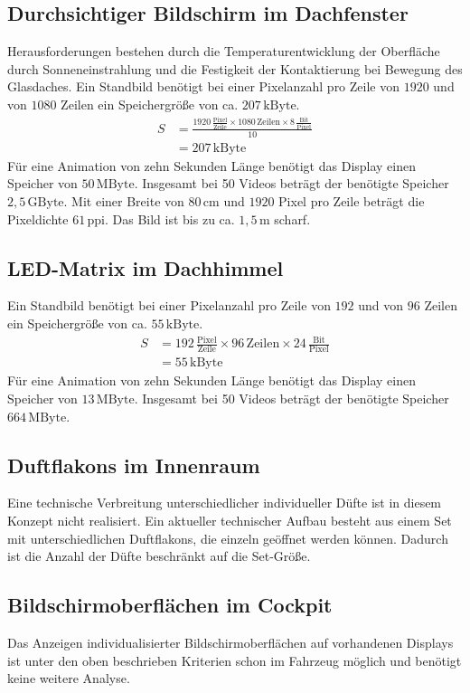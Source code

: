 \subsection{Durchsichtiger Bildschirm im Dachfenster} 
Herausforderungen bestehen durch die Temperaturentwicklung der Oberfläche durch Sonneneinstrahlung und die Festigkeit der Kontaktierung bei Bewegung des Glasdaches. 
Ein Standbild benötigt bei einer Pixelanzahl pro Zeile von $ 1920 $ und von $ 1080 $ Zeilen ein Speichergröße von ca. $ 207\,\mathrm{kByte}$. 
\begin{align}
	S &= \frac{1920\,\frac{\mathrm{Pixel}}{\mathrm{Zeile}}\times 1080\,\mathrm{Zeilen} \times 8\,\frac{\mathrm{Bit}}{\mathrm{Pixel}}}{10} \\
	&= 207\,\mathrm{kByte}
\end{align}
Für eine Animation von zehn Sekunden Länge benötigt das Display einen Speicher von $ 50\,\mathrm{MByte}$.
Insgesamt bei 50 Videos beträgt der benötigte Speicher $ 2,5\,\mathrm{GByte}$.
Mit einer Breite von $ 80\,\mathrm{cm} $ und $ 1920 $ Pixel pro Zeile beträgt die Pixeldichte $ 61\,\mathrm{ppi} $. Das Bild ist bis zu ca. $ 1,5\,\mathrm{m} $ scharf.
\subsection{LED-Matrix im Dachhimmel}
Ein Standbild benötigt bei einer Pixelanzahl pro Zeile von $ 192 $ und von $ 96 $ Zeilen ein Speichergröße von ca. $ 55\,\mathrm{kByte}$. 
\begin{align}
	S &= 192\,\frac{\mathrm{Pixel}}{\mathrm{Zeile}}\times 96\,\mathrm{Zeilen} \times 24\,\frac{\mathrm{Bit}}{\mathrm{Pixel}} \\
	&= 55\,\mathrm{kByte}
\end{align}
Für eine Animation von zehn Sekunden Länge benötigt das Display einen Speicher von $ 13\,\mathrm{MByte}$.
Insgesamt bei 50 Videos beträgt der benötigte Speicher $ 664\,\mathrm{MByte}$.
\subsection{Duftflakons im Innenraum}
Eine technische Verbreitung unterschiedlicher individueller Düfte ist in diesem Konzept nicht realisiert. Ein aktueller technischer Aufbau besteht aus einem Set mit unterschiedlichen Duftflakons, die einzeln geöffnet werden können. Dadurch ist die Anzahl der Düfte beschränkt auf die Set-Größe.
\subsection{Bildschirmoberflächen im Cockpit}
Das Anzeigen individualisierter Bildschirmoberflächen auf vorhandenen Displays ist unter den oben beschrieben Kriterien schon im Fahrzeug möglich und benötigt keine weitere Analyse.
